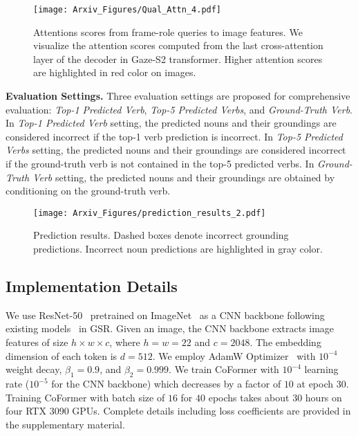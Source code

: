 \begin{figure*}[t!]
    \centering
    \texttt{[image: Arxiv\_Figures/Qual\_Attn\_4.pdf]}
    \caption{
    Attentions scores from \mbox{frame-role} queries to image features.
    We visualize the attention scores computed from the last cross-attention layer of the decoder in \mbox{Gaze-S2} transformer.
    Higher attention scores are highlighted in red color on images.
    }
    \label{fig:qual_role_attn}
\end{figure*}

\noindent \textbf{Evaluation Settings.} 
Three evaluation settings are proposed for comprehensive evaluation: \textit{\mbox{Top-1} Predicted Verb}, \textit{\mbox{Top-5} Predicted Verbs}, and \textit{\mbox{Ground-Truth} Verb}.
In \textit{\mbox{Top-1} Predicted Verb} setting, the predicted nouns and their groundings are considered incorrect if the \mbox{top-1} verb prediction is incorrect.
In \textit{\mbox{Top-5} Predicted Verbs} setting, the predicted nouns and their groundings are considered incorrect if the \mbox{ground-truth} verb is not contained in the \mbox{top-5} predicted verbs.
In \textit{\mbox{Ground-Truth} Verb} setting, the predicted nouns and their groundings are obtained by conditioning on the \mbox{ground-truth} verb.
\begin{figure*}[t!]
    \centering
    \texttt{[image: Arxiv\_Figures/prediction\_results\_2.pdf]}
    \caption{
    Prediction results.
    Dashed boxes denote incorrect grounding predictions.
    Incorrect noun predictions are highlighted in gray color.
    }
    \vspace{-2mm}
    \label{fig:qual_pred}
\end{figure*}

\subsection{Implementation Details}
We use \mbox{ResNet-50}~\cite{resnet} pretrained on ImageNet~\cite{deng2009imagenet} as a CNN backbone following existing models~\cite{pratt2020grounded,cho2021gsrtr} in GSR.
Given an image, the CNN backbone extracts image features of size $h \times w \times c$, where $h = w = 22$ and $c=2048$.
The embedding dimension of each token is $d=512$.
We employ AdamW Optimizer~\cite{loshchilov2018decoupled} with $10^{-4}$ weight decay, $\beta_1=0.9$, and $\beta_2=0.999$.
We train \mbox{CoFormer} with $10^{-4}$ learning rate ($10^{-5}$ for the CNN backbone) which decreases by a factor of $10$ at epoch $30$.
Training \mbox{CoFormer} with batch size of $16$ for $40$ epochs takes about $30$ hours on four RTX 3090 GPUs.
Complete details including loss coefficients are provided in the supplementary material.

